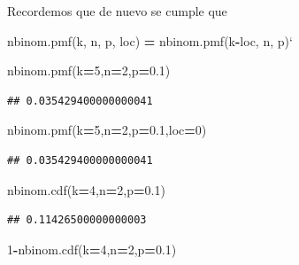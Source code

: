 \documentclass[]{book}
\newenvironment{Shaded}{\begin{snugshade}}{\end{snugshade}}
\newcommand{\DecValTok}[1]{\textcolor[rgb]{0.00,0.00,0.81}{#1}}
\newcommand{\FloatTok}[1]{\textcolor[rgb]{0.00,0.00,0.81}{#1}}
\newcommand{\NormalTok}[1]{#1}
\newcommand{\OperatorTok}[1]{\textcolor[rgb]{0.81,0.36,0.00}{\textbf{#1}}}
\begin{document}
Recordemos que de nuevo se cumple que

\begin{Shaded}
\begin{Highlighting}[]
\NormalTok{nbinom.pmf(k, n, p, loc) }\OperatorTok{=}\NormalTok{ nbinom.pmf(k}\OperatorTok{-}\NormalTok{loc, n, p)`}
\end{Highlighting}
\end{Shaded}

\begin{Shaded}
\begin{Highlighting}[]
\NormalTok{nbinom.pmf(k}\OperatorTok{=}\DecValTok{5}\NormalTok{,n}\OperatorTok{=}\DecValTok{2}\NormalTok{,p}\OperatorTok{=}\FloatTok{0.1}\NormalTok{)}
\end{Highlighting}
\end{Shaded}

\begin{verbatim}
## 0.035429400000000041
\end{verbatim}

\begin{Shaded}
\begin{Highlighting}[]
\NormalTok{nbinom.pmf(k}\OperatorTok{=}\DecValTok{5}\NormalTok{,n}\OperatorTok{=}\DecValTok{2}\NormalTok{,p}\OperatorTok{=}\FloatTok{0.1}\NormalTok{,loc}\OperatorTok{=}\DecValTok{0}\NormalTok{)}
\end{Highlighting}
\end{Shaded}

\begin{verbatim}
## 0.035429400000000041
\end{verbatim}

\begin{Shaded}
\begin{Highlighting}[]
\NormalTok{nbinom.cdf(k}\OperatorTok{=}\DecValTok{4}\NormalTok{,n}\OperatorTok{=}\DecValTok{2}\NormalTok{,p}\OperatorTok{=}\FloatTok{0.1}\NormalTok{)}
\end{Highlighting}
\end{Shaded}

\begin{verbatim}
## 0.11426500000000003
\end{verbatim}

\begin{Shaded}
\begin{Highlighting}[]
\DecValTok{1}\OperatorTok{-}\NormalTok{nbinom.cdf(k}\OperatorTok{=}\DecValTok{4}\NormalTok{,n}\OperatorTok{=}\DecValTok{2}\NormalTok{,p}\OperatorTok{=}\FloatTok{0.1}\NormalTok{)}
\end{Highlighting}
\end{Shaded}
\end{document}
